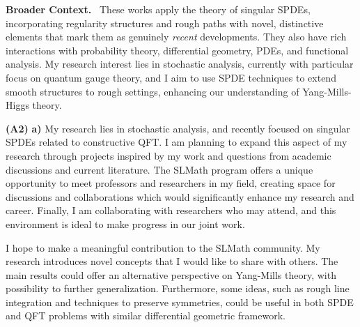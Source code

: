 \documentclass[./Research_statement.tex]{subfiles}
\begin{document}
\vspace{2pt}

\noindent \textbf{Broader Context.}\ 
%
%
These works apply the theory of singular SPDEs, incorporating regularity structures and rough paths with novel, distinctive elements that mark them as genuinely \textit{recent} developments. They also have rich interactions with probability theory, differential geometry, PDEs, and functional analysis. My research interest lies in stochastic analysis, currently with particular focus on quantum gauge theory, and I aim to use SPDE techniques to extend smooth structures to rough settings, enhancing our understanding of Yang-Mills-Higgs theory. 
%
\newpage 

\noindent \textbf{(A2)} \textbf{a)} 
My research lies in stochastic analysis, and recently focused on singular SPDEs related to constructive QFT. I am planning to expand this aspect of my research through projects inspired by my work and  questions from academic discussions and current literature. The SLMath program offers a unique opportunity to meet professors and researchers in my field, creating space for discussions and collaborations which would significantly enhance my research and career. Finally, I am collaborating with researchers who may attend, and this environment is ideal to make progress in our joint work. 

I hope to make a meaningful contribution to the SLMath community. My research introduces novel concepts that I would like to share with others. The main results could offer an alternative perspective on Yang-Mills theory, with possibility to further generalization. Furthermore, some ideas, such as rough line integration and techniques to preserve symmetries, could be useful in both SPDE and QFT problems with similar differential geometric framework.



\end{document}
